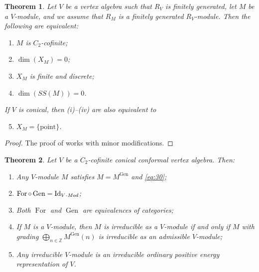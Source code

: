\documentclass[a4paper, 12pt, reqno]{amsart}
\newtheorem{theorem}{Theorem}[section]
\theoremstyle{remark}
\DeclareMathOperator{\Id}{Id}
\DeclareMathOperator{\For}{For}
\DeclareMathOperator{\Gen}{Gen}
\begin{document}
\begin{theorem}
  \label{thr:60}
  Let $V$ be a vertex algebra such that $R_V$ is finitely generated, let $M$ be a $V$-module, and we assume that $R_M$ is a finitely generated $R_V$-module.
  Then the following are equivalent:
  \begin{enumerate}
  \item $M$ is $C_2$-cofinite;
  \item $\dim(X_M) = 0$;
  \item $X_M$ is finite and discrete;
  \item $\dim(SS(M)) = 0$.
  \end{enumerate}
  If $V$ is conical, then \emph{(i)--(iv)} are also equivalent to
  \begin{enumerate}
    \setcounter{enumi}{4}
  \item $X_M = \{\mathrm{point}\}$.
  \end{enumerate}
\end{theorem}

\begin{proof}
  The proof of  works with minor modifications.
\end{proof}

\begin{theorem}
  \label{thr:61}
  Let $V$ be a $C_2$-cofinite conical conformal vertex algebra.
  Then:
  \begin{enumerate}
  \item Any $V$-module $M$ satisfies $M = M^{\Gen}$ and \eqref{eq:30};
  \item $\For\circ\Gen = \Id_{\text{\emph{$V$-Mod}}}$;
  \item Both $\For$ and $\Gen$ are equivalences of categories;
  \item If $M$ is a $V$-module, then $M$ is irreducible as a $V$-module if and only if $M$ with grading $\bigoplus_{n \in \mathbb{Z}}M^{\Gen}(n)$ is irreducible as an admissible $V$-module;
  \item Any irreducible $V$-module is an irreducible ordinary positive energy representation of $V$.
  \end{enumerate}
\end{theorem}
\end{document}
